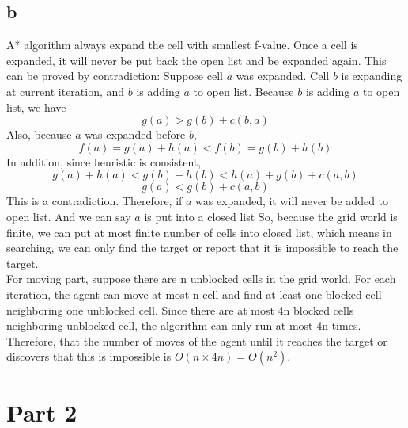 \documentclass[11pt]{article}
\begin{document}
\subsection*{b}
 A* algorithm always expand the cell with smallest f-value. Once a cell is expanded, it will never be put back the open list and be expanded again. This can be proved by contradiction:
 \newline
 Suppose cell $a$ was expanded. Cell $b$ is expanding at current iteration, and $b$ is adding $a$ to open list.
 \newline
 Because $b$ is adding $a$ to open list, we have
 $$g(a) > g(b) + c(b, a)$$
 Also, because $a$ was expanded before $b$,
 $$f(a) = g(a) + h(a) < f(b) = g(b) + h(b)$$
 In addition, since heuristic is consistent,
 $$g(a) + h(a) < g(b) + h(b) < h(a) + g(b) + c(a, b)$$
 $$g(a) < g(b) + c(a, b)$$
 This is a contradiction. Therefore, if $a$ was expanded, it will never be added to open list. And we can say $a$ is put into a closed list
 \newline
 So, because the grid world is finite, we can put at most finite number of cells into closed list, which means in searching, we can only find the target or report that it is impossible to reach the target.\\
 For moving part, suppose there are n unblocked cells in the grid world. For each iteration, the agent can move at most n cell and find at least one blocked cell neighboring one unblocked cell. Since there are at most 4n blocked cells neighboring unblocked cell, the algorithm can only run at most 4n times. Therefore, that the number of moves of the agent until it reaches the target or discovers that this is impossible is $O(n\times 4n)=O(n^2)$.




\section*{Part 2}
\end{document}
